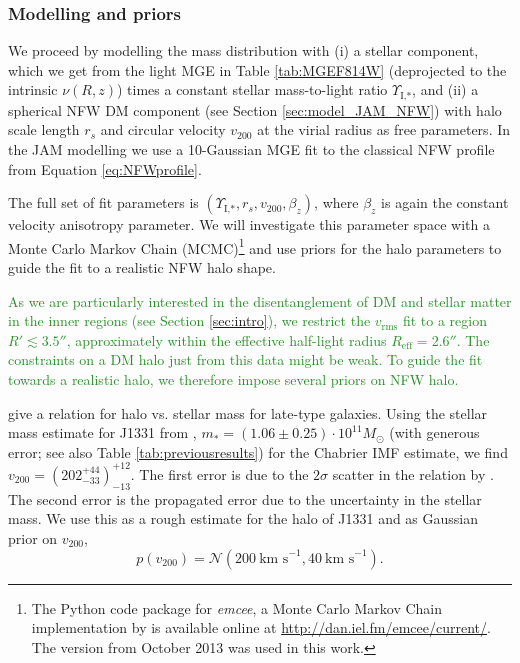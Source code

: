 \documentclass[useAMS,usenatbib]{mnras}
\newcommand{\NEW}[1]{\textcolor{ForestGreen}{#1}}
\begin{document}
\subsubsection{Modelling and priors}

We proceed by modelling the mass distribution with (i) a stellar component, which we get from the light MGE in Table \ref{tab:MGEF814W} (deprojected to the intrinsic $\nu(R,z)$) times a constant stellar mass-to-light ratio $\Upsilon_\text{I,*}$, and (ii) a spherical NFW DM component (see Section \ref{sec:model_JAM_NFW}) with halo scale length $r_s$ and circular velocity $v_{200}$ at the virial radius as free parameters. In the JAM modelling we use a 10-Gaussian MGE fit to the classical NFW profile from Equation \eqref{eq:NFWprofile}.

The full set of fit parameters is $(\Upsilon_\text{I,*},r_s,v_{200},\beta_z)$, where $\beta_z$ is again the constant velocity anisotropy parameter. We will investigate this parameter space with a Monte Carlo Markov Chain (MCMC)\footnote{The Python code package for \emph{emcee}, a Monte Carlo Markov Chain implementation by \citet{emcee} is available online at \url{http://dan.iel.fm/emcee/current/}. The version from October 2013 was used in this work.} \citep{emcee} and use priors for the halo parameters to guide the fit to a realistic NFW halo shape.

\NEW{As we are particularly interested in the disentanglement of DM and stellar matter in the inner regions (see Section \ref{sec:intro}), we restrict the $v_\text{rms}$ fit to a region $R'\lesssim3.5''$, approximately within the effective half-light radius $R_\text{eff}=2.6''$. The constraints on a DM halo just from this data might be weak. To guide the fit towards a realistic halo, we therefore impose several priors on NFW halo.}

\citet{Dutton10} give a relation for halo vs. stellar mass for late-type galaxies. Using the stellar mass estimate for J1331 from \citet{SWELLSI}, $m_* = (1.06 \pm 0.25) \cdot 10^{11} M_\odot$ (with generous error; see also Table \ref{tab:previousresults}) for the Chabrier IMF estimate, we find ${v_{200}} = (202_{-33}^{+44})_{-13}^{+12}$. The first error is due to the $2\sigma$ scatter in the relation by \citet{Dutton10}. The second error is the propagated error due to the uncertainty in the stellar mass. We use this as a rough estimate for the halo of J1331 and as Gaussian prior on $v_{200}$, 
\begin{equation}
p(v_{200}) = \mathscr{N}(200~\text{km s}^{-1},40~\text{km s}^{-1}). \label{eq:prior_v200}
\end{equation}
\end{document}
